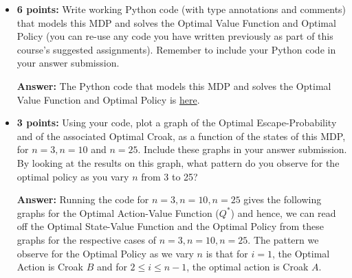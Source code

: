 \documentclass[12pt]{exam}
\begin{document}
\begin{questions}
\begin{itemize}
{\bf Answer: } The state space $\mathcal{S} = \{i \mid 0 \leq i \leq n\}$, with each state $i$ representing the number of the lilypad the frog is on. States $i=0$ and $i=n$ are terminating states. The action space $\mathcal{A} = \{A,B\}$ corresponding to the two choices of croak sounds. The state transitions are given by:
$$
Pr[i' \mid (i,A)]  \text{ for } 1 \leq i \leq n-1 =
\begin{cases}
\frac i n & \text{ for } i' = i - 1\\
\frac {n-1} n  & \text{ for } i' = i + 1\\
0 & \text{ otherwise}
\end{cases}
$$
$$
Pr[i' \mid (i,B)]  \text{ for } 1 \leq i \leq n-1 =
\begin{cases}
 \frac 1 n & \text{ for all } 0 \leq i' \leq n \text{ and } i' \neq i\\
 0 & \text{for } i' = i
 \end{cases}
$$
Let us define $R(i, a, i')$ as the {\em Reward} when transitioning to state $i'$ from state $i$ upon taking action $a$.
$$
R(i, a, i') \text{ for } 1\leq i \leq n-1, a \in \{A,B\} = 
\begin{cases}
1 & \text{ for } i' = n\\
0 & \text{ otherwise}
\end{cases}
$$

\item {\bf 6 points:} Write working Python code (with type annotations and comments) that models this MDP and solves the Optimal Value Function and Optimal Policy (you can re-use any code you have written previously as part of this course's suggested assignments). Remember to include your Python code in your answer submission.

{\bf Answer:} The Python code that models this MDP and solves the Optimal Value Function and Optimal Policy is \href{https://github.com/coverdrive/MDP-DP-RL/blob/master/src/examples/simple_mdp.py}{here}.

\item {\bf 3 points:} Using your code, plot a graph of the Optimal Escape-Probability and of the associated Optimal Croak, as a function of the states of this MDP, for $n=3, n=10$ and $n=25$. Include these graphs in your answer submission. By looking at the results on this graph, what pattern do you observe for the optimal policy as you vary $n$ from 3 to 25? 

{\bf Answer:} Running the code for $n=3, n=10, n=25$ gives the following graphs for the Optimal Action-Value Function ($Q^*$) and hence, we can read off the Optimal State-Value Function and the Optimal Policy from these graphs for the respective cases of $n=3, n=10, n=25$. The pattern we observe for the Optimal Policy as we vary $n$ is that for $i=1$, the Optimal Action is Croak $B$ and for $2 \leq i \leq n-1$, the optimal action is Croak $A$.


\end{itemize}
\end{questions}
\end{document}
